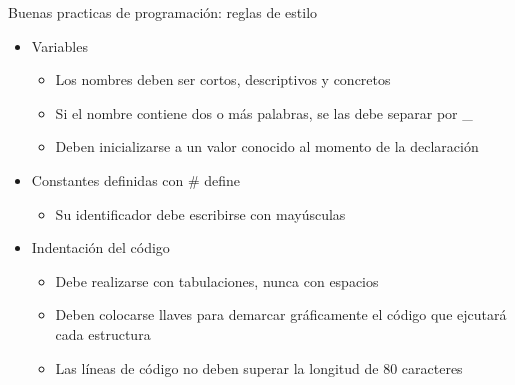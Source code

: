 \documentclass[xcolor=pdftex,table,11pt]{beamer}
\begin{document}
\begin{frame}{Buenas practicas de programación: reglas de estilo}
\begin{itemize}
\item<1-> Variables 
	\begin{itemize}
		\item<2-> Los nombres deben ser cortos, descriptivos y concretos
		\item<3-> Si el nombre contiene dos o más palabras, se las debe separar por \_
		\item<4-> Deben inicializarse a un valor conocido al momento de la declaración
	\end{itemize}
	
\item<5-> Constantes definidas con \# define 
	\begin{itemize}
		\item<6-> Su identificador debe escribirse con mayúsculas
	\end{itemize}



\item<7-> Indentación del código
	\begin{itemize}
		\item<8-> Debe realizarse con tabulaciones, nunca con espacios
		\item<9-> Deben colocarse llaves para demarcar gráficamente el código que ejcutará cada estructura
		\item<10-> Las líneas de código no deben superar la longitud de 80 caracteres
	\end{itemize}
\end{itemize}

    
\end{frame}
\end{document}
